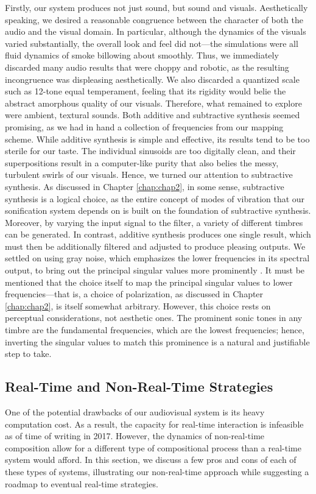 Firstly, our system produces not just sound, but sound and visuals. Aesthetically speaking, we desired a reasonable congruence between the character of both the audio and the visual domain. In particular, although the dynamics of the visuals varied substantially, the overall look and feel did not---the simulations were all fluid dynamics of smoke billowing about smoothly. Thus, we immediately discarded many audio results that were choppy and robotic, as the resulting incongruence was displeasing aesthetically. We also discarded a quantized scale such as 12-tone equal temperament, feeling that its rigidity would belie the abstract amorphous quality of our visuals. Therefore, what remained to explore were ambient, textural sounds. Both additive and subtractive synthesis seemed promising, as we had in hand a collection of frequencies from our mapping scheme. While additive synthesis is simple and effective, its results tend to be too sterile for our taste. The individual sinusoids are too digitally clean, and their superpositions result in a computer-like purity that also belies the messy, turbulent swirls of our visuals. Hence, we turned our attention to subtractive synthesis. As discussed in Chapter \ref{chap:chap2}, in some sense, subtractive synthesis is a logical choice, as the entire concept of modes of vibration that our sonification system depends on is built on the foundation of subtractive synthesis. Moreover, by varying the input signal to the filter, a variety of different timbres can be generated. In contrast, additive synthesis produces one single result, which must then be additionally filtered and adjusted to produce pleasing outputs. We settled on using gray noise, which emphasizes the lower frequencies in its spectral output, to bring out the principal singular values more prominently \cite{wilson2011supercollider}. It must be mentioned that the choice itself to map the principal singular values to lower frequencies---that is, a choice of polarization, as discussed in Chapter \ref{chap:chap2}, is itself somewhat arbitrary. However, this choice rests on perceptual considerations, not aesthetic ones. The prominent sonic tones in any timbre are the fundamental frequencies, which are the lowest frequencies; hence, inverting the singular values to match this prominence is a natural and justifiable step to take.

\subsection{Real-Time and Non-Real-Time Strategies}
One of the potential drawbacks of our audiovisual system is its heavy computation cost. As a result, the capacity for real-time interaction is infeasible as of time of writing in 2017. However, the dynamics of non-real-time composition allow for a different 
type of compositional process than a real-time system would afford. In this section, we discuss a few pros and cons of each of these types of systems, illustrating our non-real-time approach while suggesting a roadmap to eventual real-time strategies.

